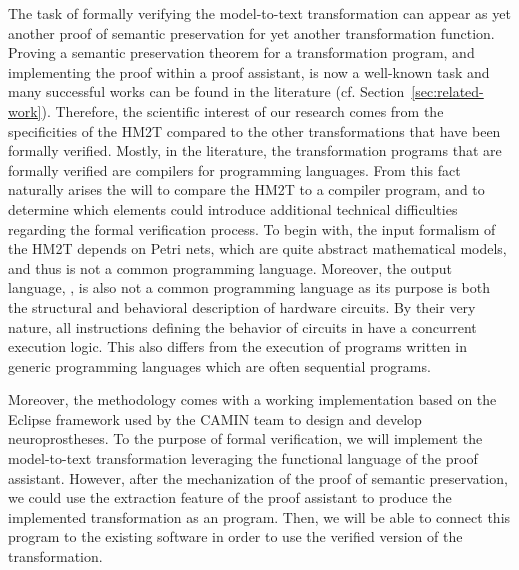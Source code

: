\documentclass[pdflatex,sn-mathphys]{sn-jnl}%
\theoremstyle{thmstyleone}%
\theoremstyle{thmstyletwo}%
\theoremstyle{thmstylethree}%
\begin{document}
The task of formally verifying the \hilecop{} model-to-text
transformation can appear as yet another proof of semantic
preservation for yet another transformation function. Proving a
semantic preservation theorem for a transformation program, and
implementing the proof within a proof assistant, is now a well-known
task and many successful works can be found in the literature
(cf. Section~\ref{sec:related-work}).  Therefore, the scientific
interest of our research comes from the specificities of the HM2T
compared to the other transformations that have been formally
verified. Mostly, in the literature, the transformation programs that
are formally verified are compilers for programming languages. From
this fact naturally arises the will to compare the HM2T to a compiler
program, and to determine which elements could introduce additional
technical difficulties regarding the formal verification process.  To
begin with, the input formalism of the HM2T depends on Petri nets,
which are quite abstract mathematical models, and thus is not a common
programming language.  Moreover, the output language, \vhdl{}, is also
not a common programming language as its purpose is both the
structural and behavioral description of hardware circuits. By their
very nature, all instructions defining the behavior of circuits in
\vhdl{} have a concurrent execution logic. This also differs from the
execution of programs written in generic programming languages which
are often sequential programs.


Moreover, the \hilecop{} methodology comes with a working
implementation based on the Eclipse framework used by the CAMIN team
to design and develop neuroprostheses. %
To the purpose of formal verification, we will implement the
\hilecop{} model-to-text transformation leveraging the functional
language of the \coq{} proof assistant. However, after the
mechanization of the proof of semantic preservation, we could use the
extraction feature of the \coq{} proof assistant to produce the
implemented transformation as an \ocaml{} program. Then, we will be
able to connect this program to the existing \hilecop{} software in
order
to use the verified version of the transformation.\\
\end{document}
